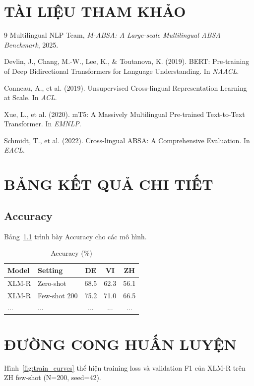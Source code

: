 \documentclass[12pt,a4paper,oneside]{report}
\begin{document}
\chapter*{TÀI LIỆU THAM KHẢO}
\begin{thebibliography}{9}
Multilingual NLP Team, \textit{M-ABSA: A Large-scale Multilingual ABSA Benchmark}, 2025.

Devlin, J., Chang, M.-W., Lee, K., \& Toutanova, K. (2019). BERT: Pre-training of Deep Bidirectional Transformers for Language Understanding. In \textit{NAACL}.

Conneau, A., et al. (2019). Unsupervised Cross-lingual Representation Learning at Scale. In \textit{ACL}.

Xue, L., et al. (2020). mT5: A Massively Multilingual Pre-trained Text-to-Text Transformer. In \textit{EMNLP}.

Schmidt, T., et al. (2022). Cross-lingual ABSA: A Comprehensive Evaluation. In \textit{EACL}.
\end{thebibliography}

\appendix
\chapter{BẢNG KẾT QUẢ CHI TIẾT}
\section{Accuracy}
Bảng~\ref{tab:acc} trình bày Accuracy cho các mô hình.

\begin{table}[ht]
\centering
\caption{Accuracy (\%)}
\label{tab:acc}
\begin{tabular}{l l c c c}
\toprule
Model & Setting & DE & VI & ZH \\
\midrule
XLM-R & Zero-shot & 68.5 & 62.3 & 56.1 \\
XLM-R & Few-shot 200 & 75.2 & 71.0 & 66.5 \\
... & ... & ... & ... & ... \\
\bottomrule
\end{tabular}
\end{table}

\chapter{ĐƯỜNG CONG HUẤN LUYỆN}
Hình~\ref{fig:train_curves} thể hiện training loss và validation F1 của XLM-R trên ZH few-shot (N=200, seed=42).
\end{document}
